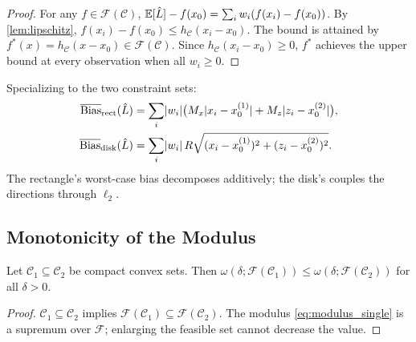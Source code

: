 \begin{proof}
	For any $f \in \mathcal{F}(\mathcal{C})$,
	$\operatorname{\mathbb{E}}[\hat{L}] - f(x_0) = \sum_i w_i (f(x_i) - f(x_0))$.
	By \cref{lem:lipschitz}, $f(x_i) - f(x_0) \leq h_{\mathcal{C}}(x_i - x_0)$.
	The bound is attained by $f^*(x) = h_{\mathcal{C}}(x - x_0) \in \mathcal{F}(\mathcal{C})$.
	Since $h_{\mathcal{C}}(x_i - x_0) \geq 0$, $f^*$ achieves the upper bound at every observation when all $w_i \geq 0$.

\end{proof}

Specializing to the two constraint sets:
\begin{align}
	\overline{\mathrm{Bias}}_{\mathrm{rect}}(\hat{L}) &= \sum_{i} \lvert w_i\rvert \bigl( M_x \lvert x_i - x_0^{(1)}\rvert + M_z \lvert z_i - x_0^{(2)}\rvert \bigr), \label{eq:wcb_rect} \\
	\overline{\mathrm{Bias}}_{\mathrm{disk}}(\hat{L}) &= \sum_{i} \lvert w_i\rvert \, R \sqrt{(x_i - x_0^{(1)})^2 + (z_i - x_0^{(2)})^2}. \label{eq:wcb_disk}
\end{align}
The rectangle's worst-case bias decomposes additively; the disk's couples the directions through $\ell_2$.


\subsection{Monotonicity of the Modulus}\label{sec:technical:monotonicity}

\begin{theorem}[Monotonicity]\label{thm:monotonicity}
	Let $\mathcal{C}_1 \subseteq \mathcal{C}_2$ be compact convex sets.
	Then $\omega(\delta; \mathcal{F}(\mathcal{C}_1)) \leq \omega(\delta; \mathcal{F}(\mathcal{C}_2))$ for all $\delta > 0$.
\end{theorem}

\begin{proof}
	$\mathcal{C}_1 \subseteq \mathcal{C}_2$ implies $\mathcal{F}(\mathcal{C}_1) \subseteq \mathcal{F}(\mathcal{C}_2)$.
	The modulus \eqref{eq:modulus_single} is a supremum over $\mathcal{F}$; enlarging the feasible set cannot decrease the value.
\end{proof}

